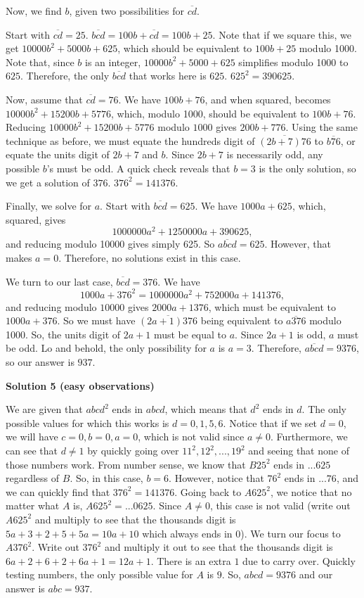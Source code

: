 \begin{enumerate}
 Now, we find $b$, given two possibilities for $\overline{cd}$. 

 Start with $\overline{cd} = 25$. $\overline{bcd} = 100b + \overline{cd} = 100b + 25.$ Note that if we square this, we get $10000b^2 + 5000b + 625$, which should be equivalent to $100b + 25$ modulo 1000. Note that, since $b$ is an integer, $10000b^2 + 5000 + 625$ simplifies modulo 1000 to $625$. Therefore, the only $\overline{bcd}$ that works here is $625$. $625^2 = 390625$.

 Now, assume that $\overline{cd}=76$. We have $100b + 76$, and when squared, becomes $10000b^2 + 15200b + 5776$, which, modulo 1000, should be equivalent to $100b+76$. Reducing $10000b^2 + 15200b + 5776$ modulo $1000$ gives $200b + 776$. Using the same technique as before, we must equate the hundreds digit of $\overline{(2b+7)76}$ to $\overline{b76}$, or equate the units digit of $2b+7$ and $b$. Since $2b+7$ is necessarily odd, any possible $b$'s must be odd. A quick check reveals that $b=3$ is the only solution, so we get a solution of $376$. $376^2 = 141376$.

 Finally, we solve for $a$. Start with $\overline{bcd}=625$. We have $1000a + 625$, which, squared, gives 
 \[1000000a^2 + 1250000a + 390625,\] and reducing modulo 10000 gives simply 625. So $\overline{abcd}=625$. However, that makes $a=0$. Therefore, no solutions exist in this case.

 We turn to our last case, $\overline{bcd}=376$. We have 
 \[1000a + 376^2 = 1000000a^2 + 752000a + 141376,\] and reducing modulo $10000$ gives $2000a + 1376$, which must be equivalent to $1000a + 376$. So we must have $\overline{(2a+1)376}$ being equivalent to $\overline{a376}$ modulo 1000. So, the units digit of $2a+1$ must be equal to $a$. Since $2a+1$ is odd, $a$ must be odd. Lo and behold, the only possibility for $a$ is $a=3$. Therefore, $\overline{abcd}=9376$, so our answer is $\boxed{937}$.

 



\textbf{Solution 5 (easy observations)}

We are given that $abcd^2$ ends in $abcd$, which means that $d^2$ ends in $d$. The only possible values for which this works is $d=0,1,5,6$. Notice that if we set $d=0$, we will have $c=0, b=0, a=0$, which is not valid since $a\neq0$. Furthermore, we can see that $d\neq1$ by quickly going over $11^2, 12^2, ..., 19^2$ and seeing that none of those numbers work. From number sense, we know that $B25^2$ ends in $...625$ regardless of $B$. So, in this case, $b=6$. However, notice that $76^2$ ends in $...76$, and we can quickly find that $376^2=141376$. Going back to $A625^2$, we notice that no matter what $A$ is, $A625^2=...0625$. Since $A\neq0$, this case is not valid (write out $A625^2$ and multiply to see that the thousands digit is $5a+3+2+5+5a=10a+10$ which always ends in $0$). We turn our focus to $A376^2$. Write out $376^2$ and multiply it out to see that the thousands digit is $6a+2+6+2+6a+1=12a+1$. There is an extra $1$ due to carry over. Quickly testing numbers, the only possible value for $A$ is $9$. So, $abcd=9376$ and our answer is $abc=\boxed{937}$.


\end{enumerate}
